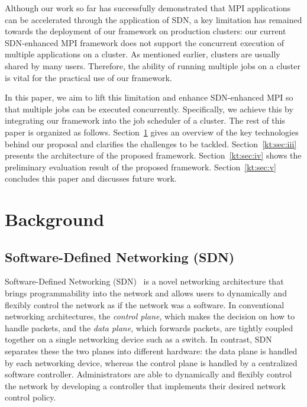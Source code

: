 \documentclass[graybox]{svmult}
\begin{document}
Although our work so far has successfully demonstrated that MPI applications
can be accelerated through the application of SDN, a key limitation has
remained towards the deployment of our framework on production clusters: our
current SDN-enhanced MPI framework does not support the concurrent execution
of multiple applications on a cluster. As mentioned earlier, clusters are
usually shared by many users. Therefore, the ability of running multiple jobs
on a cluster is vital for the practical use of our framework.

In this paper, we aim to lift this limitation and enhance SDN-enhanced MPI so
that multiple jobs can be executed concurrently. Specifically, we achieve this
by integrating our framework into the job scheduler of a cluster. The rest of
this paper is organized as follows. Section~\ref{kt:sec:ii} gives an overview
of the key technologies behind our proposal and clarifies the challenges to be
tackled. Section~\ref{kt:sec:iii} presents the architecture of the proposed
framework. Section~\ref{kt:sec:iv} shows the preliminary evaluation result of
the proposed framework. Section~\ref{kt:sec:v} concludes this paper and
discusses future work.

\section{Background}\label{kt:sec:ii}

\subsection{Software-Defined Networking (SDN)}

Software-Defined Networking (SDN)~\cite{Jamalian2015} is a novel networking
architecture that brings programmability into the network and allows users to
dynamically and flexibly control the network as if the network was a software.
In conventional networking architectures, the \textit{control plane}, which
makes the decision on how to handle packets, and the \textit {data plane},
which forwards packets, are tightly coupled together on a single networking
device such as a switch. In contrast, SDN separates these the two planes into
different hardware: the data plane is handled by each networking device,
whereas the control plane is handled by a centralized software controller.
Administrators are able to dynamically and flexibly control the network by
developing a controller that implements their desired network control policy.
\end{document}
